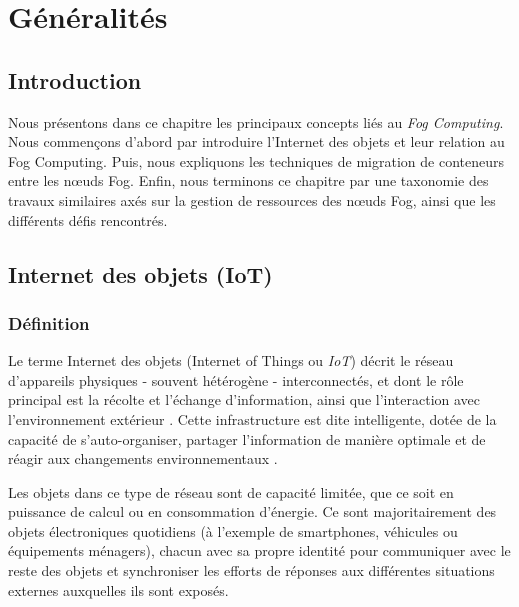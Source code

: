 \chapter{Généralités}
\section{Introduction}
Nous présentons dans ce chapitre les principaux concepts liés au \emph{\gls{Fog Computing}}. Nous commençons d'abord par introduire l'Internet des objets et leur relation au Fog Computing. Puis, nous expliquons les techniques de migration de conteneurs entre les nœuds Fog. Enfin, nous terminons ce chapitre par une taxonomie des travaux similaires axés sur la gestion de ressources des nœuds Fog, ainsi que les différents défis rencontrés. 
\section{Internet des objets (IoT)}
\subsection{Définition}
Le terme Internet des objets (Internet of Things ou \emph{\gls{IoT}}) décrit le réseau d'appareils physiques - souvent hétérogène - interconnectés, et dont le rôle principal est la récolte et l'échange d'information, ainsi que l'interaction avec l'environnement extérieur \cite{patel2016}. Cette infrastructure est dite intelligente, dotée de la capacité de s'auto-organiser, partager l'information de manière optimale et de réagir aux changements environnementaux \cite{madakam2015}.\par
Les objets dans ce type de réseau sont de capacité limitée, que ce soit en puissance de calcul ou en consommation d'énergie. Ce sont majoritairement des objets électroniques quotidiens (à l'exemple de smartphones, véhicules ou équipements ménagers), chacun avec sa propre identité pour communiquer avec le reste des objets et synchroniser les efforts de réponses aux différentes situations externes auxquelles ils sont exposés.


